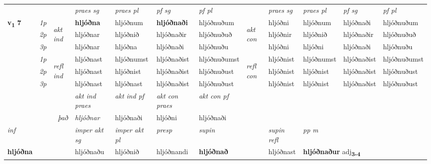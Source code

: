 \begin{longtable}[l]{X>{\footnotesize\itshape}llXXXXlXXXX}
\midrule

 & &   & \textit{praes sg}  & \textit{praes pl}    & \textit{ pf sg} & \textit{pf pl} & & \textit{praes sg}  & \textit{praes pl}    & \textit{pf sg} & \textit{pf pl }  \\ \cmidrule{4-7} \cmidrule{9-12}
 \multirow{2}{*}{{{\textbf{v{\textsubscript{1}}} \Large{\textbf{7}}}}}  & 1p & \multirow{3}{*}{\begin{turn}{90}\textit{akt ind}\end{turn}} & \textbf{hljóðna} & hljóðnum & \textbf{hljóðnaði} & hljóðnuðum & \multirow{3}{*}{\begin{turn}{90}\textit{akt con}\end{turn}} &hljóðni & hljóðnum & hljóðnaði & hljóðnuðum\\*
 & 2p &  &  hljóðnar  & hljóðnið & hljóðnaðir & hljóðnuðuð & & hljóðnir & hljóðnið & hljóðnaðir & hljóðnuðuð \\*
 & 3p &  & hljóðnar & hljóðna & hljóðnaði & hljóðnuðu & & hljóðni & hljóðni& hljóðnaði & hljóðnuðu \\*
\cmidrule{4-7} \cmidrule{9-12}
 & 1p & \multirow{3}{*}{\begin{turn}{90}\textit{refl ind}\end{turn}}  & hljóðnast & hljóðnumst & hljóðnaðist & hljóðnuðumst & \multirow{3}{*}{\begin{turn}{90}\textit{refl con}\end{turn}}  &hljóðnist & hljóðnumst & hljóðnaðist & hljóðnuðumst \\*
 & 2p &  & hljóðnast & hljóðnist & hljóðnaðist & hljóðnuðust & &hljóðnist & hljóðnist & hljóðnaðist & hljóðnuðust \\*
 & 3p  & & hljóðnast & hljóðnast & hljóðnaðist & hljóðnuðust & & hljóðnist & hljóðnist& hljóðnaðist & hljóðnuðust \\*
\cmidrule{4-7} \cmidrule{9-12}

   && &  \textit{akt ind praes} & \textit{akt ind pf} & \textit{akt con praes} & \textit{akt con pf} \\*
\multicolumn{3}{r}{\textit{það}} & hljóðnar & hljóðnaði & hljóðni & hljóðnaði \\*

\cmidrule{4-7}
   {\textit{inf}} & &  & \textit{imper akt sg} & \textit{imper akt pl}   & \textit{presp} & \textit{supin} && \textit{supin refl} & \textit{pp m} \\*
  {\textbf{hljóðna}} & && hljóðnaðu  & hljóðnið   & hljóðnandi &  \textbf{hljóðnað} && hljóðnast & \multicolumn{2}{l}{\textbf{hljóðnaður} adj\textbf{\textsubscript{3-4}}} \\*


\end{longtable}
